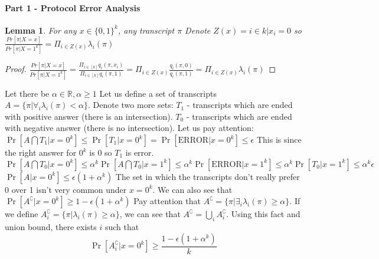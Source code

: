 \documentclass{article}
\theoremstyle{plain}
\newtheorem{lemma}[theorem]{Lemma}
\begin{document}
\paragraph{Part 1 - Protocol Error Analysis}
\begin{lemma}
For any $x \in \{0,1\}^k$, any transcript $\pi$ \newline
Denote $Z(x) = {i \in k | x_i = 0}$ so \newline
$\frac{Pr[\pi | X = x]}{Pr[\pi | X = 1^k]} = \Pi_{i \in Z(x)} \lambda_i (\pi)$
\end{lemma}
\begin{proof}
$\frac{Pr[\pi | X = x]}{Pr[\pi | X = 1^k]} = \frac{\Pi_{i \in [k]} q_i (\pi, x_i)}{\Pi_{i \in [k]} q_i (\pi, 1)} = \Pi_{i \in Z(x)} \frac{q_i (\pi, 0)}{q_i (\pi, 1)} = \Pi_{i \in Z(x)} \lambda_i (\pi)$
\end{proof}
Let there be $\alpha \in \mathbb{R}, \alpha \geq 1$ \newline
Let us define a set of transcripts $A = \{\pi | \forall_i \lambda_i (\pi) < \alpha \}$. 
Denote two more sets: $T_1$ - transcripts which are ended with positive answer (there is an intersection). $T_0$ - transcripts which are ended with negative answer (there is no intersection). \newline
Let us pay attention: \newline
$\Pr[A \bigcap T_1 | x = 0^k] \leq \Pr[T_1 | x = 0^k] = \Pr[\text{ERROR} | x = 0^k] \leq \epsilon$ \newline
This is since the right answer for $0^k$ is 0 so $T_1$ is error. \newline 
$\Pr[A \bigcap T_0 | x = 0^k] \leq \alpha ^k \Pr[A \bigcap T_0 | x = 1^k] \leq \alpha ^k \Pr[\text{ERROR} | x = 1^k] \leq \alpha ^k \Pr[T_0| x = 1^k] \leq \alpha ^k \epsilon$ \newline
$\Pr[A| x = 0^k] \leq \epsilon (1 + \alpha ^k) $ \newline
The set in which the transcripts don't really prefer 0 over 1 isn't very common under $x = 0^k$. \newline
We can also see that $\Pr[A^\complement| x = 0^k] \geq 1 - \epsilon (1 + \alpha ^k) $ \newline
Pay attention that $A^\complement = \{\pi | \exists_i \lambda_i(\pi) \geq \alpha\}$. \newline
If we define $A_{i}^\complement = \{\pi | \lambda_i(\pi) \geq \alpha\}$, we can see that $A^\complement = \bigcup_{i} A_{i}^\complement$.
Using this fact and union bound, there exists $i$ such that 
\begin{equation*}
    \Pr[A_{i}^\complement| x = 0^k] \geq \frac{1 - \epsilon (1 + \alpha ^k)}{k}
\end{equation*}
\end{document}
